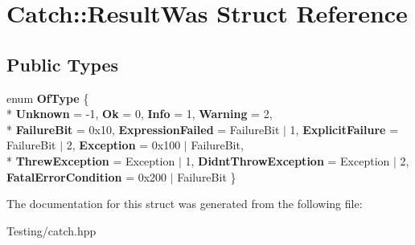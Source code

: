 \hypertarget{struct_catch_1_1_result_was}{\section{Catch\-:\-:Result\-Was Struct Reference}
\label{struct_catch_1_1_result_was}
}
\subsection*{Public Types}
\begin{DoxyCompactItemize}
\item 
enum {\bfseries Of\-Type} \{ \\*
{\bfseries Unknown} = -\/1, 
{\bfseries Ok} = 0, 
{\bfseries Info} = 1, 
{\bfseries Warning} = 2, 
\\*
{\bfseries Failure\-Bit} = 0x10, 
{\bfseries Expression\-Failed} = Failure\-Bit $\vert$ 1, 
{\bfseries Explicit\-Failure} = Failure\-Bit $\vert$ 2, 
{\bfseries Exception} = 0x100 $\vert$ Failure\-Bit, 
\\*
{\bfseries Threw\-Exception} = Exception $\vert$ 1, 
{\bfseries Didnt\-Throw\-Exception} = Exception $\vert$ 2, 
{\bfseries Fatal\-Error\-Condition} = 0x200 $\vert$ Failure\-Bit
 \}
\end{DoxyCompactItemize}


The documentation for this struct was generated from the following file\-:\begin{DoxyCompactItemize}
\item 
Testing/catch.\-hpp\end{DoxyCompactItemize}
